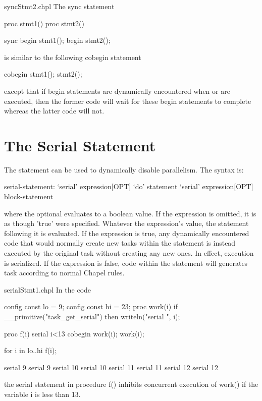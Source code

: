 \begin{chapelexample}{syncStmt2.chpl}
The sync statement
\begin{chapelpre}
proc stmt1() { }
proc stmt2() { }
\end{chapelpre}
\begin{chapel}
sync {
  begin stmt1();
  begin stmt2();
}
\end{chapel}
is similar to the following cobegin statement
\begin{chapel}
cobegin {
  stmt1();
  stmt2();
}
\end{chapel}
\begin{chapeloutput}
\end{chapeloutput}
except that if begin statements are dynamically encountered
when  or  are executed, then the former
code will wait for these begin statements to complete whereas the
latter code will not.
\end{chapelexample}

\section{The Serial Statement}
\label{Serial}

The  statement can be used to dynamically disable
parallelism.  The syntax is:
\begin{syntax}
serial-statement:
  `serial' expression[OPT] `do' statement
  `serial' expression[OPT] block-statement
\end{syntax}
where the optional  evaluates to a boolean value.  If
the expression is omitted, it is as though 'true' were specified.
Whatever the expression's value, the statement following it is
evaluated. If the expression is true, any dynamically encountered code
that would normally create new tasks within the statement is instead
executed by the original task without creating any new ones.  In
effect, execution is serialized.  If the expression is false, code
within the statement will generates task according to normal Chapel
rules.

\begin{chapelexample}{serialStmt1.chpl}
In the code
\begin{chapelpre}
config const lo = 9;
config const hi = 23;
proc work(i) {
  if \_\_primitive("task\_get\_serial") then
    writeln("serial ", i);
}
\end{chapelpre}
\begin{chapel}
proc f(i) {
  serial i<13 {
    cobegin {
      work(i);
      work(i);
    }
  }
}

for i in lo..hi {
  f(i);
}
\end{chapel}
\begin{chapelpost}
\end{chapelpost}
\begin{chapeloutput}
serial 9
serial 9
serial 10
serial 10
serial 11
serial 11
serial 12
serial 12
\end{chapeloutput}
the serial statement in procedure f() inhibits concurrent execution of
work() if the variable i is less than 13.
\end{chapelexample}

